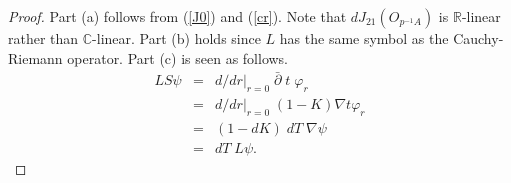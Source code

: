\documentclass[10pt,a4paper]{amsart}
\newcommand{\bean}{\begin{eqnarray*}}
\newcommand{\eean}{\end{eqnarray*}}
\begin{document}
\begin{proof}
    Part (a) follows from (\ref{J0}) and (\ref{cr}). Note that $dJ_{21}(O_{p^{-1}A})$ is ${\mathbb{R}}$-linear rather than ${\mathbb{C}}$-linear. Part (b) holds since $L$ has the same symbol as the Cauchy-Riemann operator. Part (c) is seen as follows. 
\bean 
L S \psi &=&  d/dr|_{r=0} \;\bar{\partial}\; t \;\varphi_r \\
&=&  d/dr|_{r=0} \; (1-K) \nabla t \varphi_r \\
&=&  (1-d K) \; d T  \;\nabla \psi \\
&=&  d T\; L \psi.
\eean
\end{proof}
\end{document}
